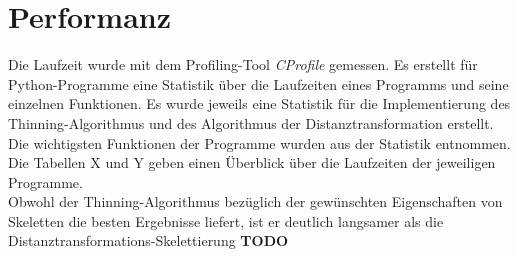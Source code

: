 \section{Performanz}
Die Laufzeit wurde mit dem Profiling-Tool \emph{CProfile} gemessen. Es erstellt für Python-Programme eine Statistik über die Laufzeiten eines Programms und seine einzelnen Funktionen. Es wurde jeweils eine Statistik
für die Implementierung des Thinning-Algorithmus und des Algorithmus der Distanztransformation erstellt. Die
wichtigsten Funktionen der Programme wurden aus der Statistik entnommen. Die Tabellen X und Y geben einen
Überblick über die Laufzeiten der jeweiligen Programme. \\
Obwohl der Thinning-Algorithmus bezüglich der gewünschten Eigenschaften von Skeletten die besten Ergebnisse
liefert, ist er deutlich langsamer als die Distanztransformations-Skelettierung \textbf{TODO} %
